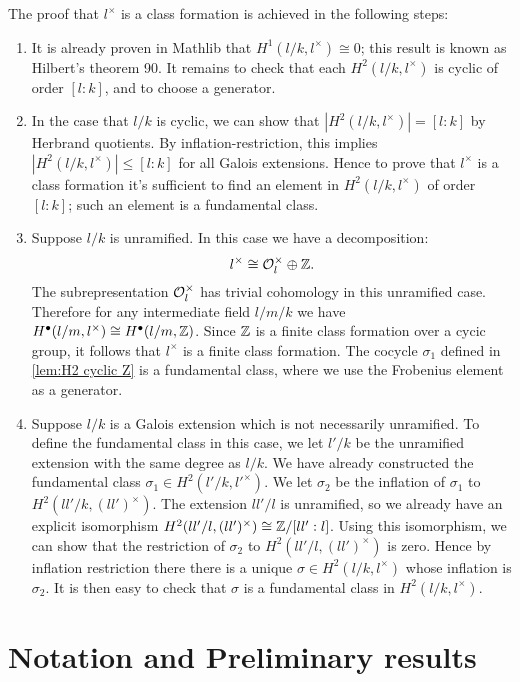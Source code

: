 The proof that $l^\times$ is a class formation is achieved in the following steps:
\begin{enumerate}
	\item
	It is already proven in Mathlib that $H^1(l/k,l^\times) \cong 0$;
	this result is known as Hilbert's theorem 90.
	It remains to check that each $H^2(l/k,l^\times)$ is cyclic of order $[l:k]$, and to
	choose a generator.
	\item
	In the case that $l/k$ is cyclic, we can show that $|H^2(l/k,l^\times)| = [l:k]$ by
	Herbrand quotients. By inflation-restriction, this implies $|H^2(l/k,l^\times)| \le [l:k]$
	for all Galois extensions. Hence to prove that $l^\times$ is a class formation it's sufficient to
	find an element in $H^2(l/k,l^\times)$ of order $[l:k]$; such an element is a fundamental class.
	\item
	Suppose $l/k$ is unramified. In this case we have a decomposition:
	\[
		l ^\times \cong {\mathcal O}_l^\times \oplus {\mathbb Z}.
	\]
	The subrepresentation ${\mathcal O}_l^\times$ has trivial cohomology in this unramified case.
	Therefore for any intermediate field $l/m/k$ we have
	$H^\bullet(l/m,l^\times) \cong H^\bullet(l/m,{\mathbb Z})$.
	Since ${\mathbb Z}$ is a finite class formation over a cycic group, it follows that $l^\times$ is a
	finite class formation.
	The cocycle $\sigma_1$ defined in \ref{lem:H2 cyclic Z} is a fundamental class,
	where we use the Frobenius element as a generator.
	\item
	Suppose $l/k$ is a Galois extension which is not necessarily unramified. To define the
	fundamental class in this case, we let $l'/k$ be the unramified extension with the same degree as
	$l/k$. We have already constructed the fundamental class $\sigma_1 \in H^2(l'/k, l'^\times)$.
	We let $\sigma_2$ be the inflation of $\sigma_1$ to $H^2(ll'/k, (ll')^\times)$.
	The extension $ll' / l$ is unramified, so we already have an explicit isomorphism
	$H^2(ll'/l, (ll')^\times) \cong {\mathbb Z} / [ll':l]$.
	Using this isomorphism, we can show that the restriction of $\sigma_2$
	to $H^2(ll'/l, (ll')^\times)$ is zero.
	Hence by inflation restriction there there is a unique $\sigma \in H^2(l/k, l^\times)$ whose
	inflation is $\sigma_2$.
	It is then easy to check that $\sigma$ is a fundamental class in $H^2(l/k,l^\times)$.
\end{enumerate}



\section{Notation and Preliminary results}

